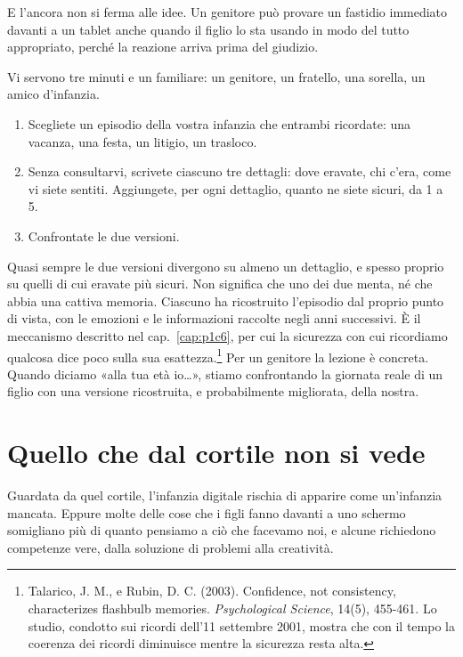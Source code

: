 E l'ancora non si ferma alle idee. Un genitore può provare un fastidio immediato davanti a un tablet anche quando il figlio lo sta usando in modo del tutto appropriato, perché la reazione arriva prima del giudizio.

\begin{provatu}
Vi servono tre minuti e un familiare: un genitore, un fratello, una sorella, un amico d'infanzia.

\begin{enumerate}[leftmargin=*,itemsep=2pt]
	\item Scegliete un episodio della vostra infanzia che entrambi ricordate: una vacanza, una festa, un litigio, un trasloco.
	\item Senza consultarvi, scrivete ciascuno tre dettagli: dove eravate, chi c'era, come vi siete sentiti. Aggiungete, per ogni dettaglio, quanto ne siete sicuri, da 1 a 5.
	\item Confrontate le due versioni.
\end{enumerate}

\spiegazione Quasi sempre le due versioni divergono su almeno un dettaglio, e spesso proprio su quelli di cui eravate più sicuri. Non significa che uno dei due menta, né che abbia una cattiva memoria. Ciascuno ha ricostruito l'episodio dal proprio punto di vista, con le emozioni e le informazioni raccolte negli anni successivi. È il meccanismo descritto nel cap.~\ref{cap:p1c6}, per cui la sicurezza con cui ricordiamo qualcosa dice poco sulla sua esattezza.\footnote{Talarico, J. M., e Rubin, D. C. (2003). Confidence, not consistency, characterizes flashbulb memories. \textit{Psychological Science}, 14(5), 455-461. Lo studio, condotto sui ricordi dell'11 settembre 2001, mostra che con il tempo la coerenza dei ricordi diminuisce mentre la sicurezza resta alta.} Per un genitore la lezione è concreta. Quando diciamo «alla tua età io…», stiamo confrontando la giornata reale di un figlio con una versione ricostruita, e probabilmente migliorata, della nostra.
\end{provatu}

\section{Quello che dal cortile non si vede}

Guardata da quel cortile, l'infanzia digitale rischia di apparire come un'infanzia mancata. Eppure molte delle cose che i figli fanno davanti a uno schermo somigliano più di quanto pensiamo a ciò che facevamo noi, e alcune richiedono competenze vere, dalla soluzione di problemi alla creatività.

